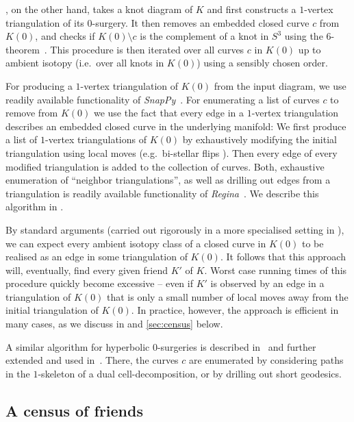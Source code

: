 \documentclass{amsart} %
\theoremstyle{thm}
\theoremstyle{definition}
\numberwithin{equation}{section}
\begin{document}
, on the other hand, takes a knot diagram of $K$ and first constructs a $1$-vertex triangulation of its $0$-surgery. 
It then removes an embedded closed curve $c$ from $K(0)$, and checks if $K(0)\setminus c$ is the complement of a knot in $S^3$ using the $6$-theorem~\cite{Ag00,La00}. This procedure is then iterated over all curves $c$ in $K(0)$ up to ambient isotopy (i.e.\ over all knots in $K(0)$) using a sensibly chosen order.

For producing a $1$-vertex triangulation of $K(0)$ from the input diagram, we use readily available functionality of {\em SnapPy}~\cite{SnapPy}. For enumerating a list of curves $c$ to remove from $K(0)$ we use the fact that every edge in a $1$-vertex triangulation describes an embedded closed curve in the underlying manifold: We first produce a list of $1$-vertex triangulations of $K(0)$ by exhaustively modifying the initial triangulation using local moves (e.g.\ bi-stellar flips \cite{Pachner,Rubinstein2019}). Then every edge of every modified triangulation is added to the collection of curves. Both, exhaustive enumeration of ``neighbor triangulations'', as well as drilling out edges from a triangulation is readily available functionality of {\em Regina}~\cite{Regina}. We describe this algorithm in .

By standard arguments (carried out rigorously in a more specialised setting in \cite{knotted_edge}), we can expect every ambient isotopy class of a closed curve in $K(0)$ to be realised as an edge in some triangulation of $K(0)$. It follows that this approach will, eventually, find every given friend $K'$ of $K$. Worst case running times of this procedure quickly become excessive -- even if $K'$ is observed by an edge in a triangulation of $K(0)$ that is only a small number of local moves away from the initial triangulation of $K(0)$. In practice, however, the approach is efficient in many cases, as we discuss in  and \ref{sec:census} below.

A similar algorithm for hyperbolic $0$-surgeries is described in~\cite{Dunfield_exterior_to_link} and further extended and used in~\cite{Dunfield_Gong}. There, the curves $c$ are enumerated by considering paths in the $1$-skeleton of a dual cell-decomposition, or by drilling out short geodesics. 

\subsection{A census of friends}
\end{document}
